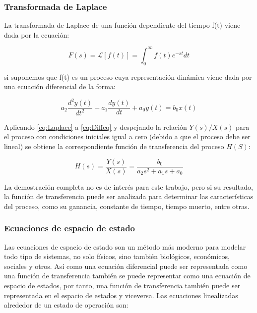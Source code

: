 		\subsubsection{Transformada de Laplace}
		
			La transformada de Laplace de una función dependiente del tiempo f(t) viene dada por la ecuación:
			
			\begin{equation}\label{eq:Laplace}
				F(s) = \mathcal{L}\left[f(t) \right] = \int_{0}^{\infty} f(t)e^{-st}dt
			\end{equation}
			
			\noindent si suponemos que f(t) es un proceso cuya representación dinámica viene dada por una ecuación diferencial de la forma:
			
			\begin{equation}\label{eq:Diffeq}
				a_{2}\frac{d^{2}y(t)}{dt^{2}} + a_{1}\frac{dy(t)}{dt} + a_{0}y(t) = b_{0}x(t)
			\end{equation}
			
			Aplicando \cref{eq:Laplace} a \cref{eq:Diffeq}  y despejando la relación $Y(s)/X(s)$ para el proceso con condiciones iniciales igual a cero (debido a que el proceso debe ser lineal) se obtiene la correspondiente función de transferencia del proceso $H(S)$:
			
			 \begin{equation}\label{eq:TransferFunction}
			 	H(s) =	\frac{Y(s)}{X(s)} = \frac{b_{0}}{a_{2}s^{2} + a_{1}s + a_{0}}
			 \end{equation}
			 
			 La demostración completa \Parencite[pp.$\,$21-22]{smith1985principles} no es de interés para este trabajo, pero si su resultado, la función de transferencia puede ser analizada para determinar las características del proceso, como su ganancia, constante de tiempo, tiempo muerto, entre otras.
			 
		 \subsubsection{Ecuaciones de espacio de estado}
		 
		 	Las ecuaciones de espacio de estado son un método más moderno para modelar todo tipo de sistemas, no solo físicos, sino también biológicos, económicos, sociales y otros. Así como una ecuación diferencial puede ser representada como una función de transferencia también se puede representar como una ecuación de espacio de estados, por tanto, una función de transferencia también puede ser representada en el espacio de estados y viceversa. Las ecuaciones linealizadas alrededor de un estado de operación \Parencite[p.$\,$31]{ogata2003ingenieria} son:
		 
